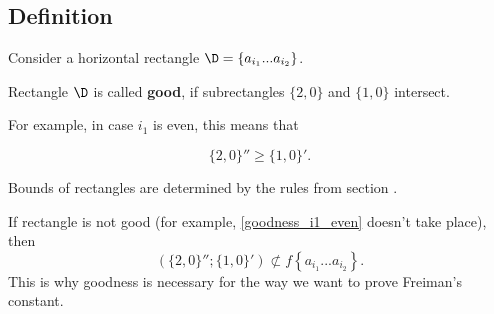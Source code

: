 \subsection{Definition}

Consider a horizontal rectangle $\D = \left\{ a_{i_1} ... a_{i_2} \right\}$.

\begin{definition}
	Rectangle $\D$ is called \textbf{good},
	if subrectangles
	$\{2, 0\}$ and $\{1, 0\}$ intersect.
\end{definition}


For example, in case $i_1$ is even, this means that

\begin{equation}\label{goodness_i1_even}
	\{2, 0\}'' \geqslant \{1, 0\}'.
\end{equation}

Bounds of rectangles are determined by the rules from section .

If rectangle is not good (for example, \ref{goodness_i1_even} doesn't take place), then
$$ ( \{2, 0\}'' ; \{1, 0\}' ) \not\subset
f \left\{ a_{i_1} ... a_{i_2} \right\}. $$
This is why goodness is necessary for the way we want to prove Freiman's constant.
